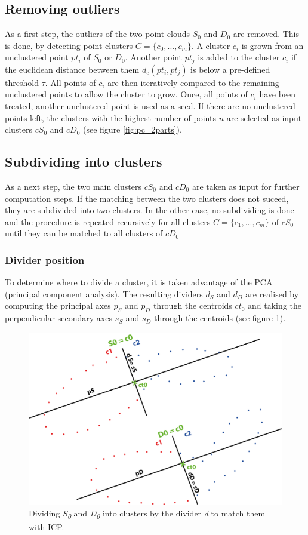 \documentclass[a4paper,english,11pt]{report}
\begin{document}
\subsection{Removing outliers}

As a first step, the outliers of the two point clouds $S_0$ and $D_0$ are removed. This is done, by detecting point clusters $C = \{{c_0, ... , c_m}\}$. A cluster $c_i$ is grown from an unclustered point $pt_i$ of $S_0$ or $D_0$. Another point $pt_j$ is added to the cluster $c_i$ if the euclidean distance between them $d_e(pt_i, pt_j)$ is below a pre-defined threshold $\tau$. All points of $c_i$ are then iteratively compared to the remaining unclustered points to allow the cluster to grow. Once, all points of $c_i$ have been treated, another unclustered point is used as a seed. If there are no unclustered points left, the clusters with the highest number of points $n$ are selected as input clusters $cS_0$ and $cD_0$ (see figure \ref{fig:pc_2parts}).

\subsection{Subdividing into clusters}

As a next step, the two main clusters $cS_0$ and $cD_0$ are taken as input for further computation steps. If the matching between the two clusters does not suceed, they are subdivided into two clusters. In the other case, no subdividing is done and the procedure is repeated recursively for all clusters $C = \{{c_1, ..., c_m}\} $ of $cS_0$ until they can be matched to all clusters of $cD_0$   

\subsubsection{Divider position}

To determine where to divide a cluster, it is taken advantage of the PCA (principal component analysis). The resulting dividers $d_S$ and $d_D$ are realised by computing the principal axes $p_S$ and $p_D$ through the centroids $ct_0$ and taking the perpendicular secondary axes $s_S$ and $s_D$ through the centroids (see figure \ref{fig:dc_axes_2p}).

\begin{figure}
	\centering
	\includegraphics[width=0.7\linewidth]{illustration_axes}
	\caption{Dividing \textit{S\textsubscript{0}} and \textit{D\textsubscript{0}} into clusters by the divider \textit{d} to match them with ICP.}
	\label{fig:dc_axes_2p}
\end{figure}
\end{document}
